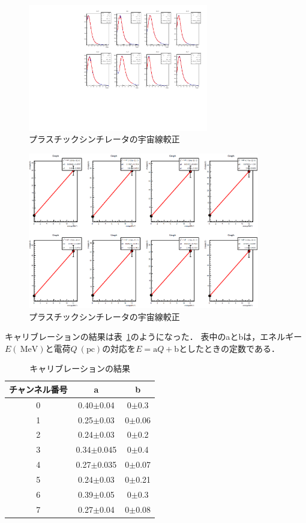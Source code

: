 \begin{figure}[H]
  \centering
  \includegraphics[width=0.7\textwidth,angle=-90]{figure/tajima/fit_langau.pdf}
  \caption{プラスチックシンチレータの宇宙線較正}\label{ps_langau}
\end{figure}
\begin{figure}[H]
  \centering
  \includegraphics[width=0.9\textwidth]{figure/tajima/fit_calibline.png}
  \caption{プラスチックシンチレータの宇宙線較正}\label{ps_cali}
\end{figure}

 キャリブレーションの結果は表~\ref{PS_calib_table}のようになった．
 表中のaとbは，エネルギー$E(~\mathrm{MeV })$と電荷$Q~(\mathrm{pc })$の対応を$E = \mathrm{a}Q + \mathrm{b}$としたときの定数である．
 \begin{table}[h]
  \caption{キャリブレーションの結果}
  \label{PS_calib_table}
  \begin{center}
   \begin{tabular}{ccc}\toprule
    チャンネル番号&a &b \\ \hline
    0& 0.40$\pm$0.04 &0$\pm$0.3 \\
    1& 0.25$\pm$0.03 &0$\pm$0.06 \\
    2& 0.24$\pm$0.03 &0$\pm$0.2 \\
    3& 0.34$\pm$0.045 &0$\pm$0.4 \\
    4& 0.27$\pm$0.035 &0$\pm$0.07 \\
    5& 0.24$\pm$0.03 &0$\pm$0.21 \\
    6& 0.39$\pm$0.05 &0$\pm$0.3 \\
    7& 0.27$\pm$0.04 &0$\pm$0.08 \\ \bottomrule
   \end{tabular}
  \end{center}
 \end{table}%


